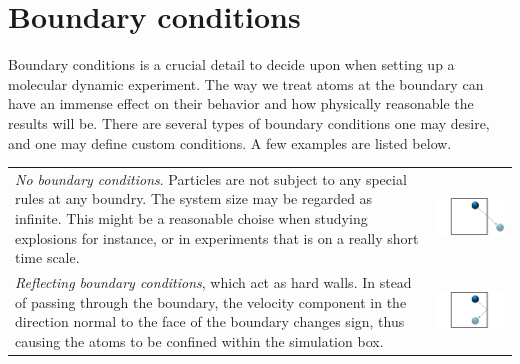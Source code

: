 \documentclass[twoside,english]{uiofysmaster}
\begin{document}
\section{Boundary conditions}
Boundary conditions is a crucial detail to decide upon when setting up a molecular dynamic experiment. The way we treat atoms at the boundary can have an immense effect on their behavior and how physically reasonable the results will be. There are several types of boundary conditions one may desire, and one may define custom conditions. A few examples are listed below. 
 

\hspace{-9.37mm}
\begin{tabular}{p{} p{}}
	\vspace{0pt}  {\it No boundary conditions}. Particles are not subject to any special rules at any boundry. The system size may be regarded as infinite. This  might be a reasonable choise when studying explosions for instance, or in experiments that is on a really short time scale.  
	& \vspace{0pt} \hspace*{-1.3cm} \includegraphics[width=1.3\linewidth]{figures/BoundaryConditions/no.pdf} 
	\\*
	\vspace{0pt} {\it Reflecting boundary conditions}, which act as hard walls. In stead of passing through the boundary, the velocity component in the direction normal to the face of the boundary changes sign, thus causing the atoms to be confined within the simulation box. 
	& \vspace{0pt} \hspace*{-1.3cm} \includegraphics[width=1.3\linewidth]{figures/BoundaryConditions/reflecting.pdf} 

\end{tabular}
\end{document}
